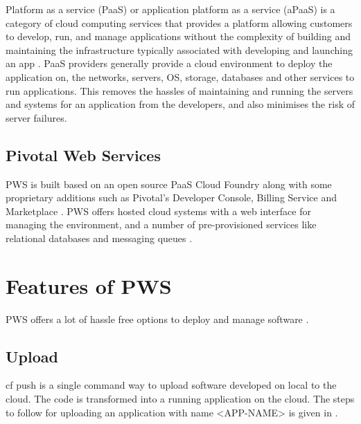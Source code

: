 \documentclass[9pt,twocolumn,twoside]{../../styles/osajnl}
\begin{document}
Platform as a service (PaaS) or application platform as a service (aPaaS) is a category of cloud computing services that provides a platform allowing customers to develop, run, and manage applications without the complexity of building and maintaining the infrastructure typically associated with developing and launching an app \cite{www-paas-wiki}. PaaS providers generally provide a cloud environment to deploy the application on, the networks, servers, OS, storage, databases and other services to run applications. This removes the hassles of maintaining and running the servers and systems for an application from the developers, and also minimises the risk of server failures. 


\subsection{Pivotal Web Services}
PWS is built based on an open source PaaS Cloud Foundry  along with some proprietary additions such as Pivotal's Developer Console, Billing Service and Marketplace \cite{www-pws-register}. PWS offers hosted cloud systems with a web interface for managing the environment, and a number of pre-provisioned services like relational databases and messaging queues \cite{www-pws-stackoverflow}. 

\section{Features of PWS}

PWS offers a lot of hassle free options to deploy and manage software \cite{www-pws-features}. 


\subsection{Upload}
cf push  is a single command way to upload software developed on local to the cloud. The code is transformed into a running application on the cloud. The steps to follow for uploading an application with name <APP-NAME> is given in \cite{www-pws-push}.
\end{document}
